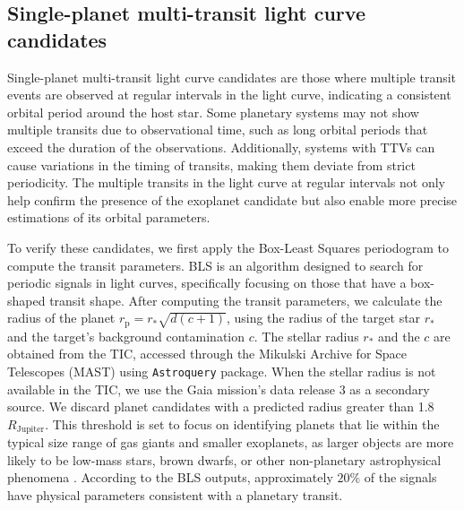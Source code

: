 \subsection{Single-planet multi-transit light curve candidates}
\label{sec:periodic_candidates}
Single-planet multi-transit light curve candidates are those where multiple transit events are observed at regular intervals in the light curve, indicating a consistent orbital period around the host star. Some planetary systems may not show multiple transits due to observational time, such as long orbital periods that exceed the duration of the observations. Additionally, systems with TTVs can cause variations in the timing of transits, making them deviate from strict periodicity. The multiple transits in the light curve at regular intervals not only help confirm the presence of the exoplanet candidate but also enable more precise estimations of its orbital parameters. \par

To verify these candidates, we first apply the Box-Least Squares 
\citep[BLS;][]{kovacs2002box} periodogram to compute the transit parameters. BLS is an algorithm designed to search for periodic signals in light curves, specifically focusing on those that have a box-shaped transit shape. After computing the transit parameters, we calculate the radius of the planet $r_{\mathrm{p}} = r_{\ast} \sqrt{d(c+1)}$, using the radius of the target star $r_{\ast}$ and the target's background contamination $c$. The stellar radius $r_{\ast}$ and the $c$ are obtained from the TIC, accessed through the Mikulski Archive for Space Telescopes (MAST) using \texttt{Astroquery} package. When the stellar radius is not available in the TIC, we use the  Gaia mission's \citep{vallenari2023gaia} data release 3 as a secondary source. We discard planet candidates with a predicted radius greater than 1.8$R_{\mathrm{Jupiter}}$. This threshold is set to focus on identifying planets that lie within the typical size range of gas giants and smaller exoplanets, as larger objects are more likely to be low-mass stars, brown dwarfs, or other non-planetary astrophysical phenomena \citep{hodvzic2018wasp, carmichael2020two}. According to the BLS outputs, approximately $20\%$ of the signals have physical parameters consistent with a planetary transit. \par


